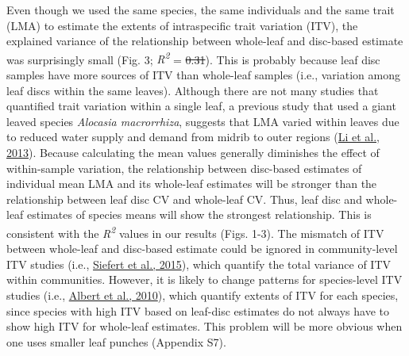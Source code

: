 \documentclass[
  12pt,
  a4paper,
,tablecaptionabove
]{scrartcl}
\providecommand{\DIFaddtex}[1]{{\protect\color{blue}\uwave{#1}}} %
\providecommand{\DIFdeltex}[1]{{\protect\color{red}\sout{#1}}}                      %
\providecommand{\DIFaddbegin}{} %
\providecommand{\DIFaddend}{} %
\providecommand{\DIFdelbegin}{} %
\providecommand{\DIFdelend}{} %
\providecommand{\DIFadd}[1]{\texorpdfstring{\DIFaddtex{#1}}{#1}} %
\providecommand{\DIFdel}[1]{\texorpdfstring{\DIFdeltex{#1}}{}} %
\newcommand{\DIFscaledelfig}{0.5}
\newlength{\DIFdelgraphicswidth} %
\newlength{\DIFdelgraphicsheight} %
\newcommand{\DIFaddincludegraphics}[2][]{{\color{blue}\fbox{\DIFOincludegraphics[#1]{#2}}}} %
\newcommand{\DIFdelincludegraphics}[2][]{%
\sbox{\DIFdelgraphicsbox}{\DIFOincludegraphics[#1]{#2}}%
\settoboxwidth{\DIFdelgraphicswidth}{\DIFdelgraphicsbox} %
\settoboxtotalheight{\DIFdelgraphicsheight}{\DIFdelgraphicsbox} %
\scalebox{\DIFscaledelfig}{%
\parbox[b]{\DIFdelgraphicswidth}{\usebox{\DIFdelgraphicsbox}\\[-\baselineskip] \rule{\DIFdelgraphicswidth}{0em}}\llap{\resizebox{\DIFdelgraphicswidth}{\DIFdelgraphicsheight}{%
\setlength{\unitlength}{\DIFdelgraphicswidth}%
\begin{picture}(1,1)%
\thicklines\linethickness{2pt} %
{\color[rgb]{1,0,0}\put(0,0){\framebox(1,1){}}}%
{\color[rgb]{1,0,0}\put(0,0){\line( 1,1){1}}}%
{\color[rgb]{1,0,0}\put(0,1){\line(1,-1){1}}}%
\end{picture}%
}\hspace*{3pt}}} %
} %
\DeclareRobustCommand{\DIFaddbegin}{\DIFOaddbegin \let\includegraphics\DIFaddincludegraphics} %
\DeclareRobustCommand{\DIFaddend}{\DIFOaddend \let\includegraphics\DIFOincludegraphics} %
\DeclareRobustCommand{\DIFdelbegin}{\DIFOdelbegin \let\includegraphics\DIFdelincludegraphics} %
\DeclareRobustCommand{\DIFdelend}{\DIFOaddend \let\includegraphics\DIFOincludegraphics} %
\begin{document}
Even though we used the same species, the same individuals and the same trait (LMA) to estimate the extents of intraspecific trait variation (ITV), the explained variance of the relationship between whole-leaf and disc-based estimate was surprisingly small (Fig. 3; \emph{R\textsuperscript{2}} = \DIFdelbegin \DIFdel{0.31}\DIFdelend \DIFaddbegin \DIFadd{0.09}\DIFaddend ).
This is probably because leaf disc samples have more sources of ITV than whole-leaf samples (i.e., variation among leaf discs within the same leaves).
Although there are not many studies that quantified trait variation within a single leaf, a previous study that used a giant leaved species \emph{Alocasia macrorrhiza}, suggests that LMA varied within leaves due to reduced water supply and demand from midrib to outer regions (\protect\hyperlink{ref-Li2013a}{Li et al., 2013}).
Because calculating the mean values generally diminishes the effect of within-sample variation, the relationship between disc-based estimates of individual mean LMA and its whole-leaf estimates will be stronger than the relationship between leaf disc CV and whole-leaf CV.
Thus, leaf disc and whole-leaf estimates of species means will show the strongest relationship.
This is consistent with the \emph{R\textsuperscript{2}} values in our results (Figs. 1-3).
The mismatch of ITV between whole-leaf and disc-based estimate could be ignored in community-level ITV studies (i.e., \protect\hyperlink{ref-Siefert2015}{Siefert et al., 2015}), which quantify the total variance of ITV within communities.
However, it is likely to change patterns for species-level ITV studies (i.e., \protect\hyperlink{ref-Albert2010a}{Albert et al., 2010}), which quantify extents of ITV for each species, since species with high ITV based on leaf-disc estimates do not always have to show high ITV for whole-leaf estimates.
This problem will be more obvious when one uses smaller leaf punches (Appendix S7).
\end{document}
